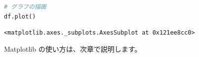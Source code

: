 \begin{lstlisting}[style=codecell,language=Python]
# グラフの描画
df.plot()
\end{lstlisting}

\begin{lstlisting}[style=outputcell]
<matplotlib.axes._subplots.AxesSubplot at 0x121ee8cc0>
\end{lstlisting}


Matplotlib の使い方は、次章で説明します。
